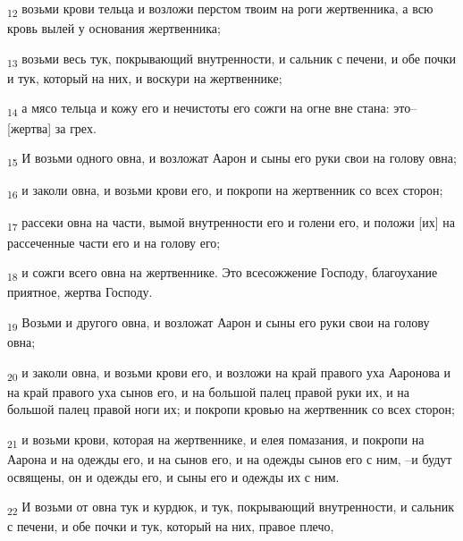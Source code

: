 \begin{tcolorbox}
\textsubscript{12} возьми крови тельца и возложи перстом твоим на роги жертвенника, а всю кровь вылей у основания жертвенника;
\end{tcolorbox}
\begin{tcolorbox}
\textsubscript{13} возьми весь тук, покрывающий внутренности, и сальник с печени, и обе почки и тук, который на них, и воскури на жертвеннике;
\end{tcolorbox}
\begin{tcolorbox}
\textsubscript{14} а мясо тельца и кожу его и нечистоты его сожги на огне вне стана: это--[жертва] за грех.
\end{tcolorbox}
\begin{tcolorbox}
\textsubscript{15} И возьми одного овна, и возложат Аарон и сыны его руки свои на голову овна;
\end{tcolorbox}
\begin{tcolorbox}
\textsubscript{16} и заколи овна, и возьми крови его, и покропи на жертвенник со всех сторон;
\end{tcolorbox}
\begin{tcolorbox}
\textsubscript{17} рассеки овна на части, вымой внутренности его и голени его, и положи [их] на рассеченные части его и на голову его;
\end{tcolorbox}
\begin{tcolorbox}
\textsubscript{18} и сожги всего овна на жертвеннике. Это всесожжение Господу, благоухание приятное, жертва Господу.
\end{tcolorbox}
\begin{tcolorbox}
\textsubscript{19} Возьми и другого овна, и возложат Аарон и сыны его руки свои на голову овна;
\end{tcolorbox}
\begin{tcolorbox}
\textsubscript{20} и заколи овна, и возьми крови его, и возложи на край правого уха Ааронова и на край правого уха сынов его, и на большой палец правой руки их, и на большой палец правой ноги их; и покропи кровью на жертвенник со всех сторон;
\end{tcolorbox}
\begin{tcolorbox}
\textsubscript{21} и возьми крови, которая на жертвеннике, и елея помазания, и покропи на Аарона и на одежды его, и на сынов его, и на одежды сынов его с ним, --и будут освящены, он и одежды его, и сыны его и одежды их с ним.
\end{tcolorbox}
\begin{tcolorbox}
\textsubscript{22} И возьми от овна тук и курдюк, и тук, покрывающий внутренности, и сальник с печени, и обе почки и тук, который на них, правое плечо,
\end{tcolorbox}
